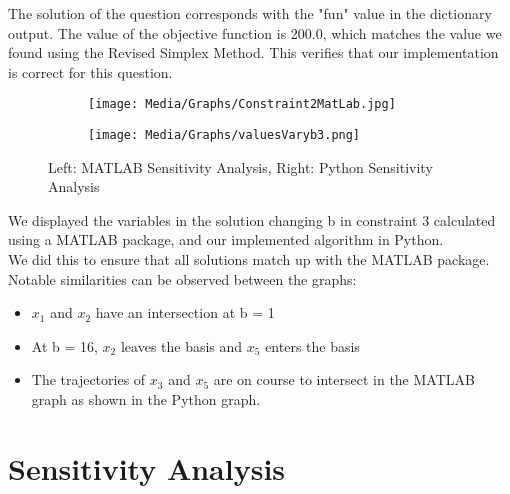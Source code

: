 \documentclass{article}
\numberwithin{equation}{section}
\begin{document}
The solution of the question corresponds with the "fun" value in the dictionary output. The value of the objective function is 200.0, which matches the value we found using the Revised Simplex Method. This verifies that our implementation is correct for this question.
\newpage
\begin{figure}
    \centering
    \begin{subfigure}{.5\textwidth}
      \centering
      \texttt{[image: Media/Graphs/Constraint2MatLab.jpg]}
    \end{subfigure}%
    \begin{subfigure}{.5\textwidth}
      \centering
      \texttt{[image: Media/Graphs/valuesVaryb3.png]}
    \end{subfigure}
    \caption{Left: MATLAB Sensitivity Analysis, Right: Python Sensitivity Analysis}
\end{figure}
We displayed the variables in the solution changing b in constraint 3 calculated using a MATLAB package, and our implemented algorithm in Python. \\
We did this to ensure that all solutions match up with the MATLAB package. \\
Notable similarities can be observed between the graphs:
\begin{itemize}
    \item $x_1$ and $x_2$ have an intersection at b = 1
    \item At b = 16, $x_2$ leaves the basis and $x_5$ enters the basis
    \item The trajectories of $x_3$ and $x_5$ are on course to intersect in the MATLAB graph as shown in the Python graph.
\end{itemize}
\newpage
\section{Sensitivity Analysis}
\end{document}
